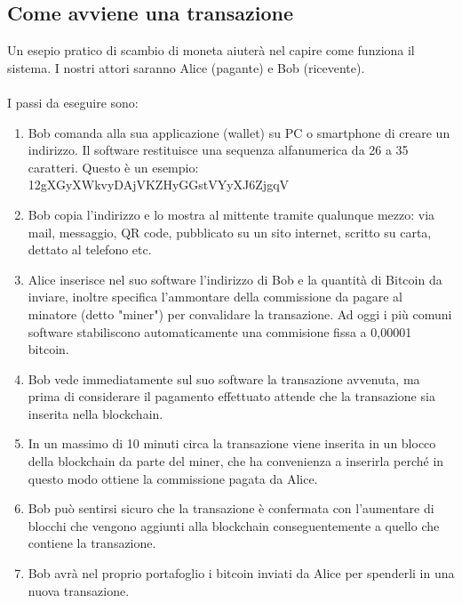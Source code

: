 \subsection{Come avviene una transazione}
\label{sec:come avviene una transazione}
Un esepio pratico di scambio di moneta aiuterà nel capire come funziona il sistema. I nostri attori saranno Alice (pagante) e Bob (ricevente).
\\
\\I passi da eseguire sono:
\begin{enumerate}\itemsep2pt

\item Bob comanda alla sua applicazione (wallet) su PC o smartphone di creare un indirizzo. Il software restituisce una sequenza alfanumerica da 26 a 35 caratteri. Questo è un esempio: 12gXGyXWkvyDAjVKZHyGGstVYyXJ6ZjgqV

\item Bob copia l'indirizzo e lo mostra al mittente tramite qualunque mezzo: via mail, messaggio, QR code, pubblicato su un sito internet, scritto su carta, dettato al telefono etc.

\item Alice inserisce nel suo software l'indirizzo di Bob e la quantità di Bitcoin da inviare, inoltre specifica l'ammontare della commissione da pagare al minatore (detto "miner") per convalidare la transazione. Ad oggi i più comuni software stabiliscono automaticamente una commisione fissa a 0,00001 bitcoin.

\item Bob vede immediatamente sul suo software la transazione avvenuta, ma prima di considerare il pagamento effettuato attende che la transazione sia inserita nella blockchain.

\item In un massimo di 10 minuti circa la transazione viene inserita in un blocco della blockchain da parte del miner, che ha convenienza a inserirla perché in questo modo ottiene la commissione pagata da Alice.

\item Bob può sentirsi sicuro che la transazione è confermata con l’aumentare di blocchi che vengono aggiunti alla blockchain conseguentemente a quello che contiene la transazione. 

\item Bob avrà nel proprio portafoglio i bitcoin inviati da Alice per spenderli in una nuova transazione.
\end{enumerate}

